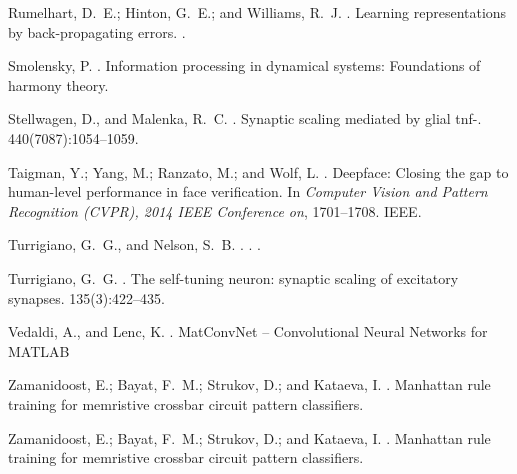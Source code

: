 \documentclass[letterpaper]{article}
\begin{document}
\begin{thebibliography}{}
Rumelhart, D.~E.; Hinton, G.~E.; and Williams, R.~J.
.
\newblock Learning representations by back-propagating errors.
.

Smolensky, P.
.
\newblock Information processing in dynamical systems: Foundations of harmony
  theory.

Stellwagen, D., and Malenka, R.~C.
.
\newblock Synaptic scaling mediated by glial tnf-.
 440(7087):1054--1059.

Taigman, Y.; Yang, M.; Ranzato, M.; and Wolf, L.
.
\newblock Deepface: Closing the gap to human-level performance in face
  verification.
\newblock In {\em Computer Vision and Pattern Recognition (CVPR), 2014 IEEE
  Conference on},  1701--1708.
\newblock IEEE.

Turrigiano, G.~G., and Nelson, S.~B.
.
.
.

Turrigiano, G.~G.
.
\newblock The self-tuning neuron: synaptic scaling of excitatory synapses.
 135(3):422--435.

Vedaldi, A., and Lenc, K.
.
\newblock MatConvNet -- Convolutional Neural Networks for MATLAB


Zamanidoost, E.; Bayat, F.~M.; Strukov, D.; and Kataeva, I.
.
\newblock Manhattan rule training for memristive crossbar circuit pattern
  classifiers.


Zamanidoost, E.; Bayat, F.~M.; Strukov, D.; and Kataeva, I.
.
\newblock Manhattan rule training for memristive crossbar circuit pattern
  classifiers.


\end{thebibliography}

\end{document}
